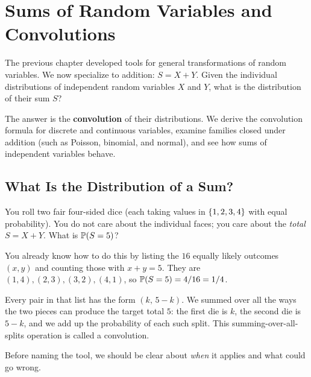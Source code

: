 \chapter{Sums of Random Variables and Convolutions}

The previous chapter developed tools for general transformations of random
variables. We now specialize to addition: $S = X + Y$. Given the individual
distributions of independent random variables $X$ and $Y$, what is the
distribution of their sum $S$?

The answer is the \textbf{convolution} of their distributions. We derive the
convolution formula for discrete and continuous variables, examine families
closed under addition (such as Poisson, binomial, and normal), and see how sums
of independent variables behave.

\chapterline

\section{What Is the Distribution of a Sum?}
\label{ch17:question}

\begin{intuitionbox}
You roll two fair four-sided dice (each taking values in $\set{1,2,3,4}$ with equal probability). You do
not care about the individual faces; you care about the \emph{total}
$S = X + Y$. What is $\P(S = 5)$?

You already know how to do this by listing the $16$ equally
likely outcomes $(x,y)$ and counting those with $x+y=5$. They are
$(1,4),(2,3),(3,2),(4,1)$, so $\P(S=5)=4/16=1/4$.

Every pair in that list has the form $(k,\,5-k)$. We summed over all
the ways the two pieces can produce the target total $5$:
the first die is $k$, the second die is $5-k$, and we add up the
probability of each such split. This summing-over-all-splits operation is
called a convolution.
\end{intuitionbox}

Before naming the tool, we should be clear about \emph{when} it applies and
what could go wrong.

